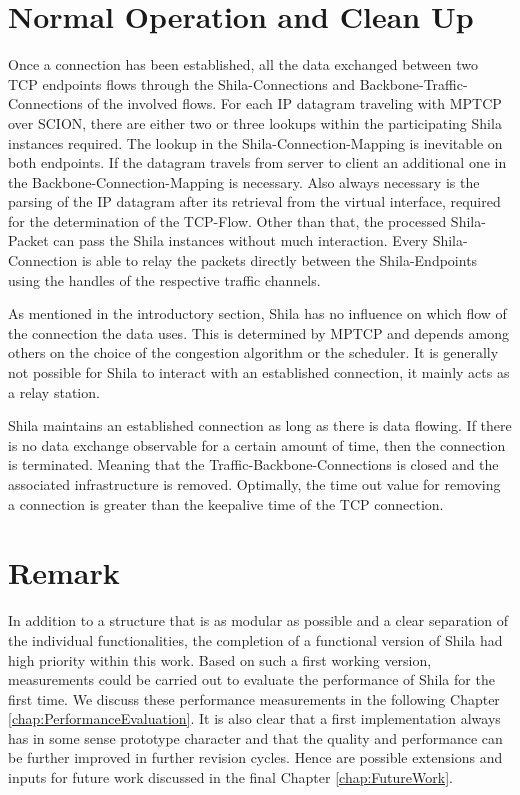 \section{Normal Operation and Clean Up}
\label{sec:ImplementationNormalOperationAndCleanUp}

Once a connection has been established, all the data exchanged between two TCP endpoints flows through the Shila-Connections and Backbone-Traffic-Connections of the involved flows. For each IP datagram traveling with MPTCP over SCION, there are either two or three lookups within the participating Shila instances required. The lookup in the Shila-Connection-Mapping is inevitable on both endpoints. If the datagram travels from server to client an additional one in the Backbone-Connection-Mapping is necessary. Also always necessary is the parsing of the IP datagram after its retrieval from the virtual interface, required for the determination of the TCP-Flow. Other than that, the processed Shila-Packet can pass the Shila instances without much interaction. Every Shila-Connection is able to relay the packets directly between the Shila-Endpoints using the handles of the respective traffic channels.

As mentioned in the introductory section, Shila has no influence on which flow of the connection the data uses. This is determined by MPTCP and depends among others on the choice of the congestion algorithm or the scheduler. It is generally not possible for Shila to interact with an established connection, it mainly acts as a relay station.

Shila maintains an established connection as long as there is data flowing. If there is no data exchange observable for a certain amount of time, then the connection is terminated. Meaning that the Traffic-Backbone-Connections is closed and the associated infrastructure is removed. Optimally, the time out value for removing a connection is greater than the keepalive time \cite{KeepaliveWiki} of the TCP connection.

\section{Remark}

In addition to a structure that is as modular as possible and a clear separation of the individual functionalities, the completion of a functional version of Shila had high priority within this work. Based on such a first working version, measurements could be carried out to evaluate the performance of Shila for the first time. We discuss these performance measurements in the following Chapter \ref{chap:PerformanceEvaluation}. It is also clear that a first implementation always has in some sense prototype character and that the quality and performance can be further improved in further revision cycles. Hence are possible extensions and inputs for future work discussed in the final Chapter \ref{chap:FutureWork}.